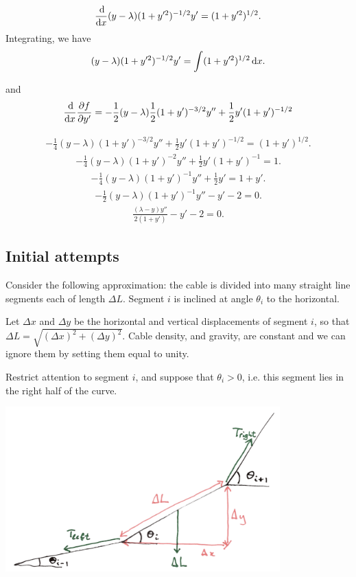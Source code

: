 \documentclass[12pt]{article}
\begin{document}
\begin{align*}
  \ddx (y - \lambda)(1 + y'^2)^{-1/2}y' = (1 + y'^2)^{1/2}.
\end{align*}
Integrating, we have
\begin{align*}
  (y - \lambda)(1 + y'^2)^{-1/2}y' = \int (1 + y'^2)^{1/2} \dx.
\end{align*}


and
\begin{align*}
  \ddx \pdfdyp = -\frac{1}{2}(y - \lambda)\frac{1}{2}(1 + y')^{-3/2}y'' + \frac{1}{2}y'(1 + y')^{-1/2}
\end{align*}

\begin{align*}
  -\frac{1}{4}(y - \lambda)(1 + y')^{-3/2}y'' + \frac{1}{2}y'(1 + y')^{-1/2} =  (1 + y')^{1/2}.
\end{align*}
\begin{align*}
  -\frac{1}{4}(y - \lambda)(1 + y')^{-2}y'' + \frac{1}{2}y'(1 + y')^{-1} =  1.
\end{align*}
\begin{align*}
  -\frac{1}{4}(y - \lambda)(1 + y')^{-1}y'' + \frac{1}{2}y' =  1 + y'.
\end{align*}
\begin{align*}
  -\frac{1}{2}(y - \lambda)(1 + y')^{-1}y'' - y' -2 =  0.
\end{align*}
\begin{align*}
  \frac{(\lambda - y)y''}{2(1 + y')} - y' -2 =  0.
\end{align*}


\subsection{Initial attempts}
Consider the following approximation: the cable is divided into many straight line segments each of
length $\Delta L$. Segment $i$ is inclined at angle $\theta_i$ to the horizontal.

Let $\Delta x$ and $\Delta y$ be the horizontal and vertical displacements of segment $i$, so that
$\Delta L = \sqrt{(\Delta x)^2 + (\Delta y)^2}$. Cable density, and gravity, are constant and we
can ignore them by setting them equal to unity.

Restrict attention to segment $i$, and suppose that $\theta_i > 0$, i.e. this segment lies in the
right half of the curve.

\begin{mdframed}
\includegraphics[width=300pt]{img/misc--puzzles--hanging-cable.png}
\end{mdframed}
\end{document}
